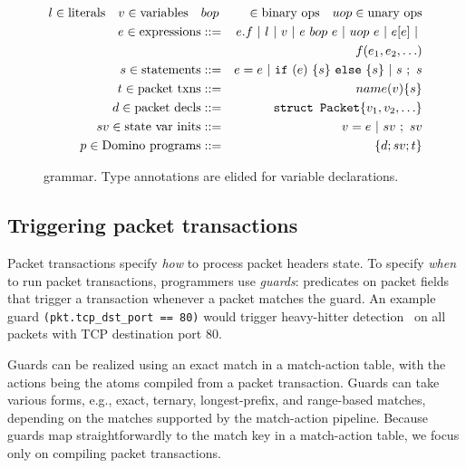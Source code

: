 \begin{figure}
\newcommand{\sep}{~|~}
\begin{scriptsize}
\begin{eqnarray*}
l \in \text{literals} \quad v \in \text{variables} \quad &bop& \in \text{binary ops} \quad
uop \in \text{unary ops} \\
%
e \in \text{expressions} &::=& e.f \sep l \sep v \sep e~bop~e \sep uop~e \sep e[e] \sep \\
                   & &   f(e_1, e_2, \ldots) \\
%
s \in \text{statements} &::=& e = e \sep {\tt if}~(e)~\{ s \}~{\tt else}~ \{ s \} \sep s~;~s \\
%
t \in \text{packet txns} &::=& name(v) \{ s \} \\
%
%
d \in \text{packet decls} &::=& \text{\tt struct Packet} \{ v_1, v_2, \ldots \} \\
%
sv \in \text{state var inits} &::=& v = e \sep sv~;~sv \\
%
p \in \text{\pktlanguage programs} &::=& \{ d ; sv; t \}
\end{eqnarray*}
\end{scriptsize}
\caption{\pktlanguage grammar. Type annotations are elided for variable declarations.}
\label{fig:grammar}
\end{figure}


\subsection{Triggering packet transactions}
\label{ss:guards}
Packet transactions specify \textit{how} to process packet headers state.  To
specify {\em when} to run packet transactions, programmers use {\em guards}:
predicates on packet fields that trigger a transaction whenever a packet
matches the guard. An example guard {\tt (pkt.tcp\_dst\_port == 80)} would
trigger heavy-hitter detection~\cite{opensketch} on all packets with TCP
destination port 80.

Guards can be realized using an exact match in a match-action table, with the
actions being the atoms compiled from a packet transaction. Guards
can take various forms, e.g., exact, ternary, longest-prefix, and range-based
matches, depending on the matches supported by the match-action
pipeline. Because guards map straightforwardly to the match key in a
match-action table, we focus only on compiling packet transactions.


